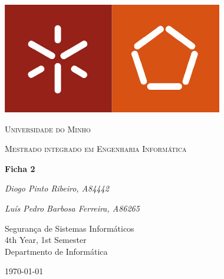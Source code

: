 \documentclass[12pt]{article}
\begin{document}
\thispagestyle{empty}
\setlength\headheight{0pt} 
\begin{center}

\begin{center}
\includegraphics[width=0.45\linewidth]{img/um_logo.jpg}            
\end{center}	

        \vspace{0.25cm}
        {\scshape\LARGE Universidade do Minho \par}
        \vspace{0.25cm}
        {\scshape\Large Mestrado integrado em Engenharia Informática\par}
        \vspace{0.5cm}

        {\Large\bfseries Ficha 2\par}
        
        \vspace{0.5cm}
        {\Large\itshape Diogo Pinto Ribeiro, A84442\par}
        {\Large\itshape Luís Pedro Barbosa Ferreira, A86265\par}
        \vspace{0.25cm}

\vspace{1cm}
Segurança de Sistemas Informáticos \\
4th Year, 1st Semester \\
Departmento de Informática\par
\vspace{1.5cm}
\large
\today

\end{center}

\clearpage
\restoregeometry
\justify

%
%
%

\renewcommand{\contentsname}{Contents}
\tableofcontents
\pagebreak

 








\printbibliography
\end{document}
